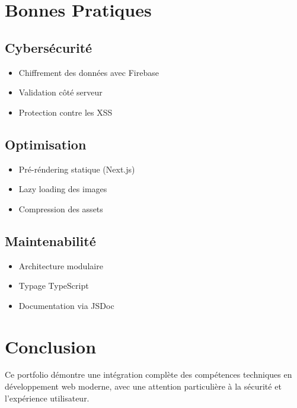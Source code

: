 \documentclass[12pt,a4paper]{report}
\begin{document}
\chapter{Bonnes Pratiques}
\section{Cybersécurité}
\begin{itemize}
\item Chiffrement des données avec Firebase
\item Validation côté serveur
\item Protection contre les XSS
\end{itemize}

\section{Optimisation}
\begin{itemize}
\item Pré-réndering statique (Next.js)
\item Lazy loading des images
\item Compression des assets
\end{itemize}

\section{Maintenabilité}
\begin{itemize}
\item Architecture modulaire
\item Typage TypeScript
\item Documentation via JSDoc
\end{itemize}

\chapter{Conclusion}
Ce portfolio démontre une intégration complète des compétences techniques en développement web moderne, avec une attention particulière à la sécurité et l'expérience utilisateur.
\end{document}
